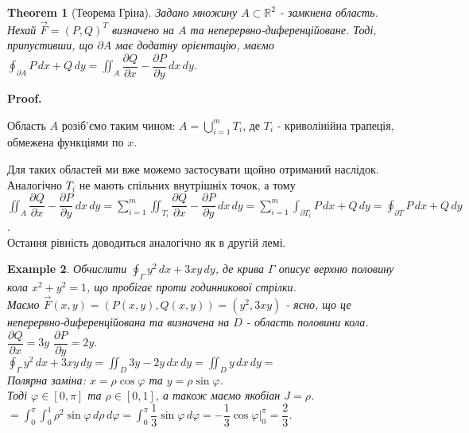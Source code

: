 \documentclass[a4paper, 10pt]{article}
\makeatletter
\def\departial#1#2{\dfrac{\partial {#1}}{\partial {#2}}}
\def\qed{$\blacksquare$}
\theoremstyle{theoremdd}
\newtheorem{theorem}{Theorem}[subsection]
\theoremstyle{theoremdd}
\theoremstyle{theoremdd}
\theoremstyle{theoremdd}
\theoremstyle{theoremdd}
\newtheorem{example}[theorem]{Example}
\theoremstyle{theoremdd}
\theoremstyle{theoremdd}
\theoremstyle{theoremdd}
\theoremstyle{theoremdd}
\theoremstyle{theoremdd}
\theoremstyle{theoremdd}
\theoremstyle{theoremdd}
\theoremstyle{theoremdd}
\theoremstyle{theoremdd}
\theoremstyle{theoremdd}
\renewenvironment{proof}[1][Proof.\\]{\par
\pushQED{\hfill \qed}%
\normalfont \topsep6\p@\@plus6\p@\relax
\trivlist
\item\relax
{\bfseries
#1\@addpunct{.}}\hspace\labelsep\ignorespaces
}{%
\popQED\endtrivlist\@endpefalse
}
\makeatother
\begin{document}
\begin{theorem}[Теорема Гріна]
Задано множину $A \subset \mathbb{R}^2$ - замкнена область. Нехай $\vec{F} = (P,Q)^T$ визначено на $A$ та неперервно-диференційоване. Тоді, припустивши, що $\partial A$ має додатну орієнтацію, маємо\\
$\displaystyle\oint_{\partial A} P\,dx + Q\,dy = \iint_A \departial{Q}{x} - \departial{P}{y}\,dx\,dy$.
\end{theorem}

\begin{proof}
Область $A$ розіб'ємо таким чином:  $A = \displaystyle\bigcup_{i=1}^m T_i$, де $T_i$ - криволінійна трапеція, обмежена функціями по $x$.
\begin{figure}[H]
\centering
{}
\end{figure}
Для таких областей ми вже можемо застосувати щойно отриманий наслідок.\\
Аналогічно $T_i$ не мають спільних внутрішніх точок, а тому\\
$\displaystyle\iint_A \departial{Q}{x} - \departial{P}{y}\,dx\,dy = \sum_{i=1}^m \iint_{T_i} \departial{Q}{x} - \departial{P}{y}\,dx\,dy = \sum_{i=1}^m \int_{\partial T_i} P\,dx+Q\,dy = \oint_{\partial T} P\,dx + Q\,dy$.\\
Остання рівність доводиться аналогічно як в другій лемі.
\end{proof}

\begin{example}
Обчислити $\displaystyle\oint_\Gamma y^2\,dx + 3xy\,dy$, де крива $\Gamma$ описує верхню половину кола $x^2+y^2 = 1$, що пробігає проти годинникової стрілки.\\
Маємо $\vec{F}(x,y) = (P(x,y),Q(x,y)) = (y^2,3xy)$ - ясно, що це неперервно-диференційована та визначена на $D$ - область половини кола.\\
$\departial{Q}{x} = 3y$ \hspace{1cm} $\departial{P}{y} = 2y$.\\
$\displaystyle\oint_\Gamma y^2\,dx + 3xy\,dy = \iint_D 3y - 2y\,dx\,dy = \iint_D y\,dx\,dy =$\\
Полярна заміна: $x = \rho \cos \varphi$ та $y = \rho \sin \varphi$.\\
Тоді $\varphi \in [0,\pi]$ та $\rho \in [0,1]$, а також маємо якобіан $J = \rho$.\\
$= \displaystyle\int_0^{\pi} \int_0^1 \rho^2 \sin \varphi \,d\rho\,d\varphi = \int_0^{\pi} \dfrac{1}{3} \sin \varphi\,d\varphi = -\dfrac{1}{3} \cos \varphi\Big|_{0}^{\pi} = \dfrac{2}{3}$.
\end{example}
\end{document}
